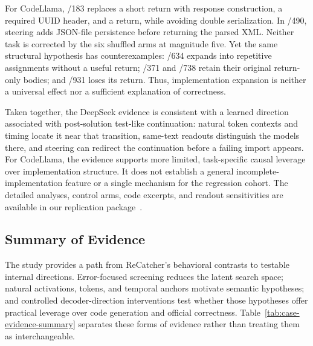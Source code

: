 For CodeLlama, /183 replaces a short return with response construction, a required UUID header, and a return, while avoiding double serialization. In /490, steering adds JSON-file persistence before returning the parsed XML. Neither task is corrected by the six shuffled arms at magnitude five. Yet the same structural hypothesis has counterexamples: /634 expands into repetitive assignments without a useful return; /371 and /738 retain their original return-only bodies; and /931 loses its return. Thus, implementation expansion is neither a universal effect nor a sufficient explanation of correctness.

Taken together, the DeepSeek evidence is consistent with a learned direction associated with post-solution test-like continuation: natural token contexts and timing locate it near that transition, same-text readouts distinguish the models there, and steering can redirect the continuation before a failing import appears. For CodeLlama, the evidence supports more limited, task-specific causal leverage over implementation structure. It does not establish a general incomplete-implementation feature or a single mechanism for the regression cohort. The detailed analyses, control arms, code excerpts, and readout sensitivities are available in our replication package~\cite{CrossCoderReplication}.

\subsection{Summary of Evidence}
\label{sec:crosscoder-evidence-summary}

The study provides a path from ReCatcher's behavioral contrasts to testable internal directions. Error-focused screening reduces the latent search space; natural activations, tokens, and temporal anchors motivate semantic hypotheses; and controlled decoder-direction interventions test whether those hypotheses offer practical leverage over code generation and official correctness. Table~\ref{tab:case-evidence-summary} separates these forms of evidence rather than treating them as interchangeable.

